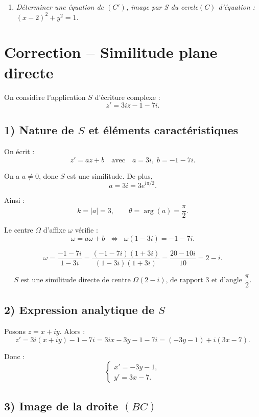 \documentclass[12pt,a4paper]{article}
\begin{document}
\begin{enumerate}
    \item[4)] \textit{Déterminer une équation de \((C')\), image par S du cercle\((C)\) d'équation : \((x - 2)^2 + y^2 = 1\).}
\end{enumerate}
\section*{Correction -- Similitude plane directe}

On considère l'application $S$ d'écriture complexe :
\[
z' = 3iz - 1 - 7i.
\]

\subsection*{1) Nature de $S$ et éléments caractéristiques}

On écrit :
\[
z' = az + b \quad \text{avec} \quad a = 3i,\; b = -1 - 7i.
\]

On a $a \neq 0$, donc $S$ est une similitude.  
De plus,
\[
a = 3i = 3e^{i\pi/2}.
\]

Ainsi :
\[
k = |a| = 3, \qquad \theta = \arg(a) = \frac{\pi}{2}.
\]

Le centre $\Omega$ d'affixe $\omega$ vérifie :
\[
\omega = a\omega + b \;\;\Longleftrightarrow\;\; \omega(1 - 3i) = -1 - 7i.
\]

\[
\omega = \frac{-1 - 7i}{1 - 3i}
= \frac{(-1 - 7i)(1 + 3i)}{(1 - 3i)(1 + 3i)}
= \frac{20 - 10i}{10}
= 2 - i.
\]

\[
\boxed{\text{$S$ est une similitude directe de centre $\Omega(2-i)$, de rapport $3$ et d'angle $\dfrac{\pi}{2}$.}}
\]

\subsection*{2) Expression analytique de $S$}

Posons $z = x + iy$. Alors :
\[
z' = 3i(x + iy) - 1 - 7i
= 3ix - 3y - 1 - 7i
= (-3y - 1) + i(3x - 7).
\]

Donc :
\[
\boxed{
\begin{cases}
x' = -3y - 1,\\
y' = 3x - 7.
\end{cases}}
\]

\subsection*{3) Image de la droite $(BC)$}
\end{document}
